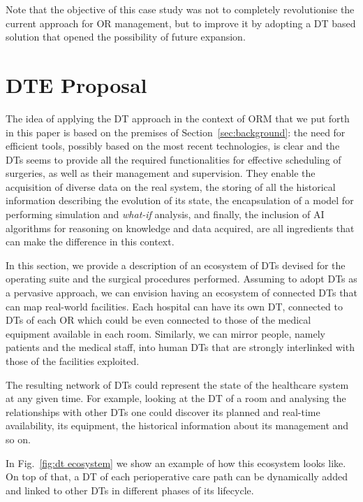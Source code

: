 Note that the objective of this case study was not to completely revolutionise the current approach for OR management, but to improve it by adopting a DT based solution that opened the possibility of future expansion.

\section{\acl{DTE} Proposal}



The idea of applying the DT approach in the context of ORM that we put forth in this paper is based on the premises of Section~\ref{sec:background}: the need for efficient tools, possibly based on the most recent technologies, is clear and the DTs seems to provide all the required functionalities for effective scheduling of surgeries, as well as their management and supervision.  
%
They enable the acquisition of diverse data on the real system, the storing of all the historical information describing the evolution of its state, the encapsulation of a model for performing simulation and \textit{what-if} analysis, and finally, the inclusion of AI algorithms for reasoning on knowledge and data acquired, are all ingredients that can make the difference in this context.

In this section, we provide a description of an ecosystem of DTs devised for the operating suite and the surgical procedures performed.
%
Assuming to adopt DTs as a pervasive approach, we can envision having an ecosystem of connected DTs that can map real-world facilities.
%
Each hospital can have its own DT, connected to DTs of each OR which could be even connected to those of the medical equipment available in each room.
%
Similarly, we can mirror people, namely patients and the medical staff, into human DTs that are strongly interlinked with those of the facilities exploited.

The resulting network of DTs could represent the state of the healthcare system at any given time. For example, looking at the DT of a room and analysing the relationships with other DTs one could discover its planned and real-time availability, its equipment, the historical information about its management and so on.

In Fig.~\ref{fig:dt ecosystem} we show an example of how this ecosystem looks like. On top of that, a DT of each perioperative care path can be dynamically added and linked to other DTs in different phases of its lifecycle. 

